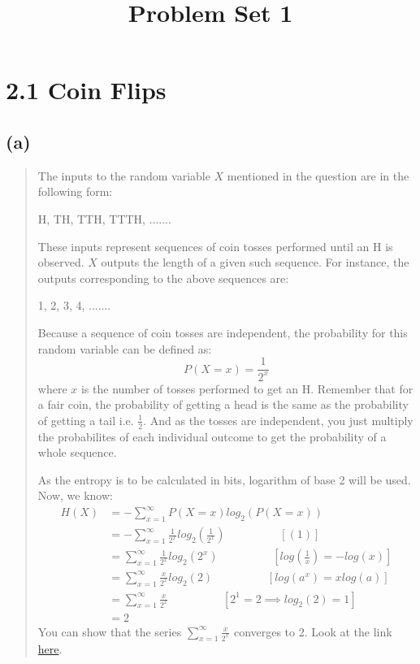 \documentclass{article}
\title{Problem Set 1}
\author{}
\date{}
\begin{document}
\maketitle
\section*{2.1 Coin Flips}
\subsection*{(a)} 
\begin{quote} 
	The inputs to the random variable $X$ mentioned in the question are in the following form:

	\begin{center}
		H, TH, TTH, TTTH, .......
	\end{center}

	These inputs represent sequences of coin tosses performed until an H is observed. $X$ outputs the length of a given such sequence. For instance, the outputs corresponding to the above sequences are:
	\begin{center}
		1, 2, 3, 4, .......
	\end{center}
	Because a sequence of coin tosses are independent, the probability for this random variable can be defined as:
	\begin{equation}
		P(X=x) = \frac{1}{2^{x}}
	\end{equation}
	where $x$ is the number of tosses performed to get an H. Remember that for a fair coin, the probability of getting a head is the same as the probability of getting a tail i.e. $\frac{1}{2}$. And as the tosses are independent, you just multiply the probabilites of each individual outcome to get the probability of a whole sequence. 

	As the entropy is to be calculated in bits, logarithm of base 2 will be used. Now, we know:
	\begin{align*}
		H(X) &= - \sum_{x=1}^{\infty}P(X=x)log_2(P(X=x)) \\
		     &= - \sum_{x=1}^{\infty}\frac{1}{2^x}log_2(\frac{1}{2^x})\hspace{2cm}[(1)] \\
		     &= \sum_{x=1}^{\infty}\frac{1}{2^x}log_2(2^x)\hspace{2cm}[log(\frac{1}{x}) = -log(x)] \\
		     &= \sum_{x=1}^{\infty}\frac{x}{2^x}log_2(2)\hspace{2cm}[log(a^x) = xlog(a)] \\
		     &= \sum_{x=1}^{\infty}\frac{x}{2^x}\hspace{2cm}[2^1 = 2 \implies log_2(2) = 1] \\
		     &= 2\hspace{2cm} 
	\end{align*}
	You can show that the series $\sum_{x=1}^{\infty}\frac{x}{2^x}$ converges to 2. Look at the link \href{https://math.stackexchange.com/questions/1102135/sum-sum-x-0-infty-fracx2x}{here}.
\end{quote}
\end{document}
